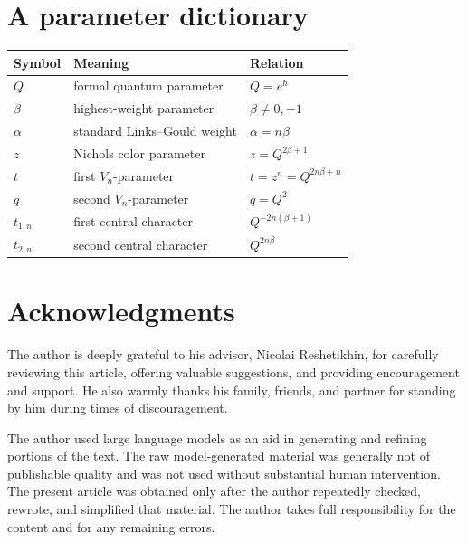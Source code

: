 \documentclass[11pt,a4paper]{article}
\theoremstyle{definition}
\theoremstyle{remark}
\begin{document}
\section{A parameter dictionary}

\begin{center}
\begin{tabular}{@{}lll@{}}
\toprule
Symbol & Meaning & Relation\\
\midrule
\(Q\) & formal quantum parameter & \(Q=e^\hbar\)\\
\(\beta\) & highest-weight parameter & \(\beta\neq0,-1\)\\
\(\alpha\) & standard Links--Gould weight & \(\alpha=n\beta\)\\
\(z\) & Nichols color parameter & \(z=Q^{2\beta+1}\)\\
\(t\) & first \(V_n\)-parameter & \(t=z^n=Q^{2n\beta+n}\)\\
\(q\) & second \(V_n\)-parameter & \(q=Q^2\)\\
\(t_{1,n}\) & first central character & \(Q^{-2n(\beta+1)}\)\\
\(t_{2,n}\) & second central character & \(Q^{2n\beta}\)\\
\bottomrule
\end{tabular}
\end{center}

\section*{Acknowledgments}

The author is deeply grateful to his advisor, Nicolai Reshetikhin, for
carefully reviewing this article, offering valuable suggestions, and providing
encouragement and support.  He also warmly thanks his family, friends, and
partner for standing by him during times of discouragement.

The author used large language models as an aid in generating and refining
portions of the text.  The raw model-generated material was generally not of
publishable quality and was not used without substantial human intervention.
The present article was obtained only after the author repeatedly checked,
rewrote, and simplified that material.  The author takes full responsibility
for the content and for any remaining errors.
\end{document}
